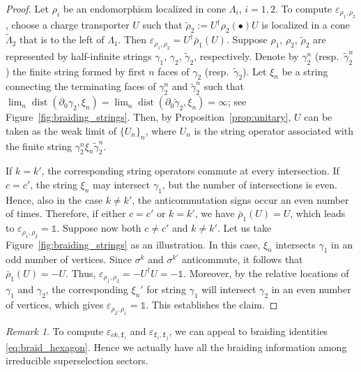 \documentclass[a4paper,11pt]{article}
\theoremstyle{definition}
\theoremstyle{remark}
\newtheorem{remark}{Remark}[section]
\theoremstyle{remark}
\begin{document}
\begin{proof}
    Let $\rho_i$ be an endomorphism localized in cone $\Lambda_i$, $i=1,2$. To compute $\varepsilon_{\rho_1,\rho_2}$, choose a charge transporter $U$ such that $\tilde{\rho}_2:=U^\dagger \rho_2(\bullet) U$ is localized in a cone $\tilde{\Lambda}_2$ that is to the left of $\Lambda_1$. 
    Then $\varepsilon_{\rho_1,\rho_2} = U^\dagger \bar{\rho}_1(U)$. Suppose $\rho_1$, $\rho_2$, $\tilde{\rho}_2$ are represented by half-infinite strings $\gamma_1$, $\gamma_2$, $\tilde{\gamma}_2$, respectively. 
    Denote by $\gamma_2^n$ (resp.~$\tilde{\gamma}_2^n$) the finite string formed by first $n$ faces of $\gamma_2$ (resp.~$\tilde{\gamma}_2$).  Let $\xi_n$ be a string connecting the terminating faces of $\gamma_2^n$ and $\tilde{\gamma}_2^n$ such that $\lim_n\operatorname{dist}(\partial_0\gamma_2,\xi_n) = \lim_n\operatorname{dist}(\partial_0\tilde{\gamma}_2,\xi_n)=\infty$; see Figure~\ref{fig:braiding_strings}. Then, by Proposition~\ref{prop:unitary}, $U$ can be taken as the weak limit of $\{U_n\}_n$, where $U_n$ is the string operator associated with the finite string $\gamma_2^n\xi_n\tilde{\gamma}_2^n$. 

    If $k=k'$, the corresponding string operators commute at every intersection. If $c=c'$, the string $\xi_n$ may intersect $\gamma_1$, but the number of intersections is even. Hence, also in the case $k\neq k'$, the anticommutation signs occur an even number of times. Therefore, if either $c=c'$ or $k=k'$, we have $\bar{\rho}_1(U) = U$, which leads to $\varepsilon_{\rho_1,\rho_2} = \mathds{1}$.   
    Suppose now both $c \neq c'$ and $k \neq k'$.
    Let us take Figure~\ref{fig:braiding_strings} as an illustration.
    In this case, $\xi_n$ intersects $\gamma_1$ in an odd number of vertices.
    Since $\sigma^k$ and $\sigma^{k'}$ anticommute, it follows that $\bar{\rho}_1(U) = -U$.
    Thus, $\varepsilon_{\rho_1,\rho_2} = -U^\dagger U = -\mathds{1}$.
    Moreover, by the relative locations of $\gamma_1$ and $\gamma_2$, the corresponding $\xi_n'$ for string $\gamma_1$ will intersect $\gamma_2$ in an even number of vertices, which gives $\varepsilon_{\rho_2,\rho_1} = \mathds{1}$. This establishes the claim. 
\end{proof}

\begin{remark}
    To compute $\varepsilon_{ck,\mathtt{f}_i}$ and $\varepsilon_{\mathtt{f}_i,\mathtt{f}_j}$, we can appeal to braiding identities \eqref{eq:braid_hexagon}. 
    Hence we actually have all the braiding information among irreducible superselection sectors. 
\end{remark}
\end{document}
